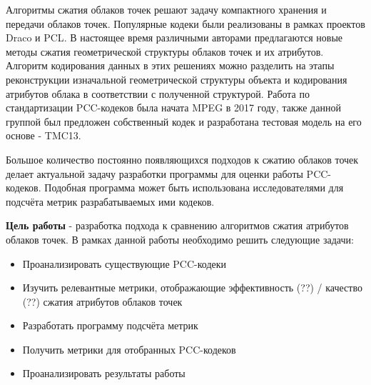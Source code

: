 Алгоритмы сжатия облаков точек решают задачу компактного хранения и передачи
облаков точек. Популярные кодеки были реализованы в рамках проектов
Draco\cite{Draco} и PCL\cite{Rusu_ICRA2011_PCL}. В настоящее время различными
авторами предлагаются новые методы сжатия геометрической структуры облаков
точек\cite{PCGCv2}\cite{quach2020improved} и их
атрибутов\cite{Shao2017}\cite{Chen2020}\cite{Sun2023}. Алгоритм кодирования
данных в этих решениях можно разделить на этапы реконструкции изначальной
геометрической структуры объекта и кодирования атрибутов облака в соответствии с
полученной структурой. Работа по стандартизации PCC-кодеков была начата MPEG в
2017 году\cite{CallForProposalV2}, также данной группой был предложен
собственный кодек и разработана тестовая модель на его основе -
TMC13\cite{TMC13}.

Большое количество постоянно появляющихся подходов к сжатию облаков точек делает
актуальной задачу разработки программы для оценки работы PCC-кодеков. Подобная
программа может быть использована исследователями для подсчёта метрик
разрабатываемых ими кодеков.

\textbf{Цель работы} - разработка подхода к сравнению алгоритмов сжатия
атрибутов облаков точек. В рамках данной работы необходимо решить следующие
задачи:

\begin{itemize}
    \item Проанализировать существующие PCC-кодеки
    \item Изучить релевантные метрики, отображающие эффективность (??) /
    качество (??) сжатия атрибутов облаков точек
    \item Разработать программу подсчёта метрик
    \item Получить метрики для отобранных PCC-кодеков
    \item Проанализировать результаты работы
\end{itemize}


